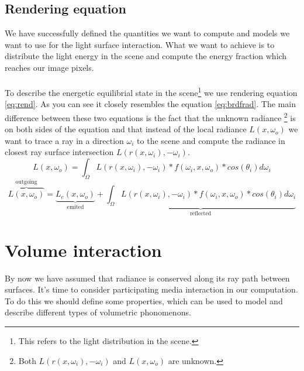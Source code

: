 \subsection{Rendering equation}
We have successfully defined the quantities we want to compute and models we want to use for the light surface interaction. What we want to achieve is to distribute the light energy in the scene and compute the energy fraction which reaches our image pixels.
\\
\\
To describe the energetic equilibrial state in the scene\footnote{This refers to the light distribution in the scene.} we use rendering equation \ref{eq:rend}. As you can see it closely resembles the equation \ref{eq:brdfrad}. The main difference between these two equations is the fact that the unknown radiance \footnote{Both $L(r(x,\omega_i),-\omega_{i})$ and $L(x,\omega_{o})$ are unknown.} is on both sides of the equation and that instead of the local radiance $L(x,\omega_{o})$ we want to trace a ray in a direction $\omega_{i}$ to the scene and compute the radiance in closest ray surface intersection $L(r(x,\omega_i),-\omega_{i})$.
\begin{equation}
L(x,\omega_{o})=\int_{\Omega}L(r(x,\omega_i),-\omega_{i})*f(\omega_{i},x,\omega_{o})*cos(\theta_{i})d\omega_{i}
\label{eq:rend}
\end{equation}
\begin{equation}
\overbrace{L(x,\omega_{o})}^\text{outgoing}=\underbrace{L_{e}(x,\omega_{o})}_\text{emited}+\underbrace{\int_{\Omega}L(r(x,\omega_i),-\omega_{i})*f(\omega_{i},x,\omega_{o})*cos(\theta_{i})d\omega_{i}}_\text{reflected}
\label{eq:rendem}
\end{equation}

\section{Volume interaction}
By now we have assumed that radiance is conserved along its ray path between surfaces. It's time to consider participating media interaction in our computation. To do this we should define some properties, which can be used to model and describe different types of volumetric phonomenons.

